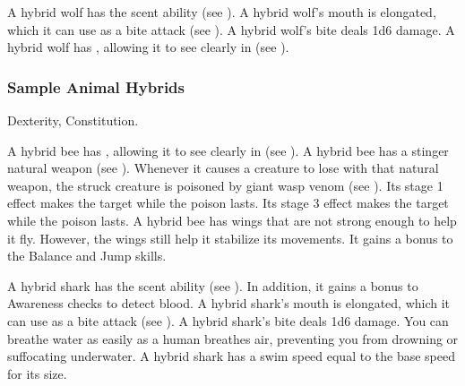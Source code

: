 
            \begin{itemize}
                 A hybrid wolf has the scent ability (see ).
                 A hybrid wolf's mouth is elongated, which it can use as a bite attack (see ).
                    A hybrid wolf's bite deals 1d6 damage.
                 A hybrid wolf has , allowing it to see clearly in  (see ).
            \end{itemize}

        \subsubsection{Sample Animal Hybrids}


              Dexterity,  Constitution.
            \begin{itemize}
                 A hybrid bee has , allowing it to see clearly in  (see ).
                 A hybrid bee has a stinger natural weapon (see ).
                    Whenever it causes a creature to lose  with that natural weapon, the struck creature is poisoned by giant wasp venom (see ).
                    Its stage 1 effect makes the target \slowed while the poison lasts.
                    Its stage 3 effect makes the target \immobilized while the poison lasts.
                 A hybrid bee has wings that are not strong enough to help it fly.
                    However, the wings still help it stabilize its movements.
                    It gains a  bonus to the Balance and Jump skills.
            \end{itemize}


            \begin{itemize}
                 A hybrid shark has the scent ability (see ).
                    In addition, it gains a  bonus to Awareness checks to detect blood.
                 A hybrid shark's mouth is elongated, which it can use as a bite attack (see ).
                    A hybrid shark's bite deals 1d6 damage.
                 You can breathe water as easily as a human breathes air, preventing you from drowning or suffocating underwater.
                 A hybrid shark has a swim speed equal to the base speed for its size.
            \end{itemize}

